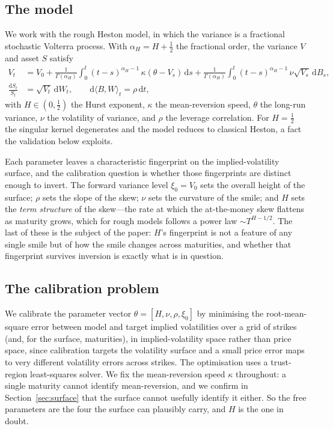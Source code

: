 \documentclass[namedate,webpdf]{ima-authoring-template}
\numberwithin{equation}{section}
\begin{document}
\subsection{The model}

We work with the rough Heston model, in which the variance is a fractional stochastic
Volterra process. With $\alpha_{\!H}=H+\tfrac12$ the fractional order, the variance $V$ and
asset $S$ satisfy
\begin{align}
V_t &= V_0 + \frac{1}{\Gamma(\alpha_{\!H})}\int_0^t (t-s)^{\alpha_{\!H}-1}\,
       \kappa(\theta - V_s)\,\mathrm{d}s
     + \frac{1}{\Gamma(\alpha_{\!H})}\int_0^t (t-s)^{\alpha_{\!H}-1}\,
       \nu\sqrt{V_s}\,\mathrm{d}B_s, \\
\frac{\mathrm{d}S_t}{S_t} &= \sqrt{V_t}\,\mathrm{d}W_t,
\qquad \mathrm{d}\langle B,W\rangle_t = \rho\,\mathrm{d}t,
\end{align}
with $H\in(0,\tfrac12)$ the Hurst exponent, $\kappa$ the mean-reversion speed, $\theta$ the
long-run variance, $\nu$ the volatility of variance, and $\rho$ the leverage correlation.
For $H=\tfrac12$ the singular kernel degenerates and the model reduces to classical Heston, a
fact the validation below exploits.

Each parameter leaves a characteristic fingerprint on the implied-volatility surface, and the
calibration question is whether those fingerprints are distinct enough to invert. The forward
variance level $\xi_0=V_0$ sets the overall height of the surface; $\rho$ sets the slope of the
skew; $\nu$ sets the curvature of the smile; and $H$ sets the \emph{term structure} of the
skew---the rate at which the at-the-money skew flattens as maturity grows, which for rough
models follows a power law $\sim T^{H-1/2}$. The last of these is the subject of the paper:
$H$'s fingerprint is not a feature of any single smile but of how the smile changes across
maturities, and whether that fingerprint survives inversion is exactly what is in question.

\subsection{The calibration problem}

We calibrate the parameter vector $\theta=[H,\nu,\rho,\xi_0]$ by minimising the
root-mean-square error between model and target implied volatilities over a grid of strikes
(and, for the surface, maturities), in implied-volatility space rather than price space, since
calibration targets the volatility surface and a small price error maps to very different
volatility errors across strikes. The optimisation uses a trust-region least-squares solver.
We fix the mean-reversion speed $\kappa$ throughout: a single maturity cannot identify
mean-reversion, and we confirm in Section~\ref{sec:surface} that the surface cannot usefully
identify it either. So the free parameters are the four the surface can plausibly carry, and
$H$ is the one in doubt.
\end{document}
